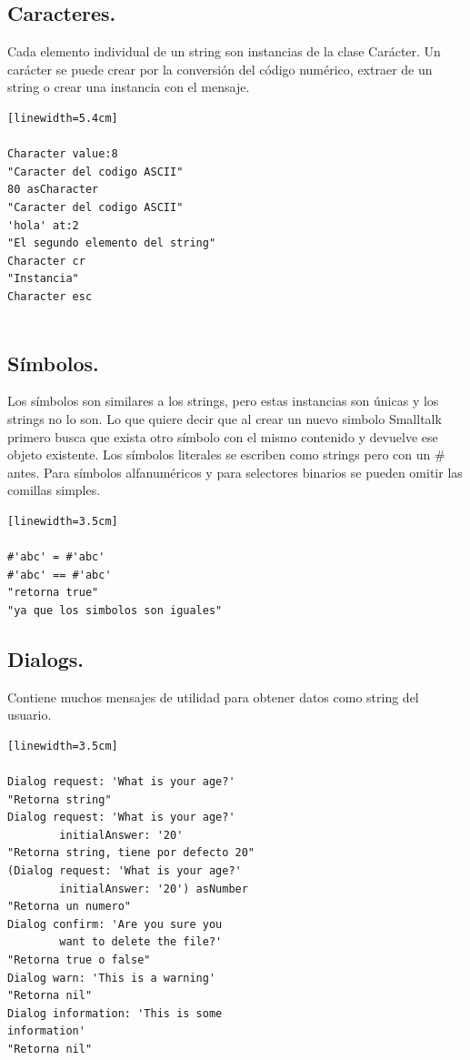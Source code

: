 \documentclass[10pt,journal,compsoc]{IEEEtran}
\begin{document}
\subsection{Caracteres.}
Cada elemento individual de un string son instancias de la clase Car\'acter. Un car\'acter se puede crear por la conversi\'on del c\'odigo num\'erico, extraer de un string o crear una instancia con el mensaje.

\begin{lstlisting}[language=Smalltalk, caption = {Ejemplo de uso de caracteres.}][linewidth=5.4cm]

Character value:8       
"Caracter del codigo ASCII"
80 asCharacter          
"Caracter del codigo ASCII"
'hola' at:2           
"El segundo elemento del string"
Character cr
"Instancia"
Character esc


\end{lstlisting}

\subsection{S\'imbolos.}
Los s\'imbolos son similares a los strings, pero estas instancias son \'unicas y los strings no lo son. Lo que quiere decir que al crear un nuevo simbolo Smalltalk primero busca que exista otro s\'imbolo con el mismo contenido y devuelve ese objeto existente.
Los s\'imbolos literales se escriben como strings pero con un \# antes. Para s\'imbolos alfanum\'ericos y para selectores binarios se pueden omitir las comillas simples.
\begin{lstlisting}[language=Smalltalk, caption = {Ejemplo de simbolos}][linewidth=3.5cm]

#'abc' = #'abc'
#'abc' == #'abc'    
"retorna true"
"ya que los simbolos son iguales"
\end{lstlisting}

\subsection{Dialogs.}
Contiene muchos mensajes de utilidad para obtener datos como string del usuario.
\begin{lstlisting}[language=Smalltalk, caption = {Ejemplo de uso y tipos de dialogs.}][linewidth=3.5cm]

Dialog request: 'What is your age?'                         
"Retorna string"
Dialog request: 'What is your age?' 
		initialAnswer: '20'     
"Retorna string, tiene por defecto 20"
(Dialog request: 'What is your age?' 
		initialAnswer: '20') asNumber      
"Retorna un numero"
Dialog confirm: 'Are you sure you 
		want to delete the file?'    
"Retorna true o false"
Dialog warn: 'This is a warning'                                
"Retorna nil"
Dialog information: 'This is some
information'                  
"Retorna nil"

\end{lstlisting}
\end{document}
